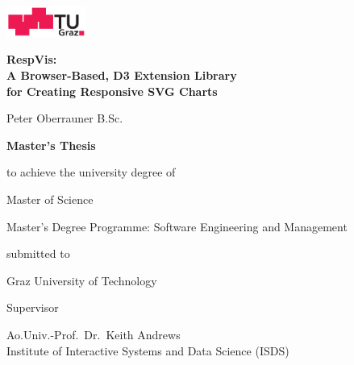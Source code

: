 \begin{center}
    \includegraphics[height=1cm]{diagrams/tugraz-logo.pdf}

    \vspace{2cm}

    \begin{spacing}{1.1}
        \huge\sffamily\bfseries
        RespVis:\\
        A Browser-Based, D3 Extension Library\\
        for Creating Responsive SVG Charts
    \end{spacing}

    \vspace{2cm}

    {\Large\sffamily Peter Oberrauner B.Sc.}

    \vspace{2cm}

    {\Large\sffamily\bfseries Master's Thesis}

    \vspace{5mm}

    {\small\sffamily to achieve the university degree of}

    \vspace{5mm}

    {\normalsize\sffamily Master of Science}

    \vspace{5mm}

    {\normalsize\sffamily
        Master's Degree Programme: Software Engineering and Management
    }


    \vspace{1cm}

    {\small\sffamily submitted to}

    \vspace{5mm}

    {\large\sffamily Graz University of Technology}



    \vspace{1cm}

    {\small\sffamily Supervisor}

    \vspace{5mm}

    {\normalsize\sffamily
        Ao.Univ.-Prof.\ Dr.\ Keith Andrews \\
        Institute of Interactive Systems and Data Science (ISDS)
    }



\end{center}
